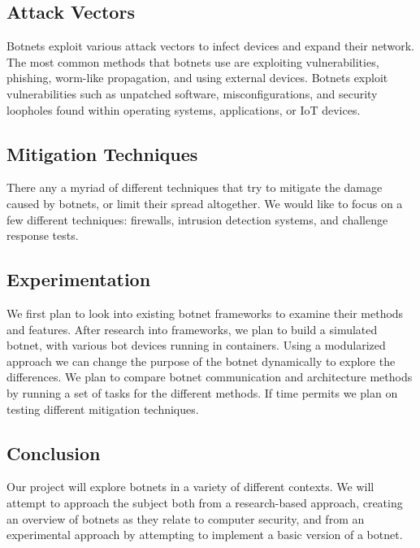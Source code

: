 \documentclass[english,12pt]{article}
\begin{document}
\subsection*{Attack Vectors}
Botnets exploit various attack vectors to infect devices 
and expand their network. The most common methods that botnets 
use are exploiting vulnerabilities, phishing, worm-like propagation, 
and using external devices. Botnets exploit vulnerabilities such as 
unpatched software, misconfigurations, and security loopholes 
found within operating systems, applications, or IoT devices. 
\subsection*{Mitigation Techniques}
There any a myriad of different techniques that try to mitigate the damage
caused by botnets, or limit their spread altogether. We would like to focus
on a few different techniques: firewalls, intrusion detection systems, and
challenge response tests. 
\subsection*{Experimentation}
We first plan to look into existing 
botnet frameworks to examine their methods and features. 
After research into frameworks, we plan to build a simulated botnet, 
with various bot devices running in containers. 
Using a modularized approach we can change the purpose of the botnet 
dynamically to explore the differences. We plan to compare botnet 
communication and architecture methods by running a set of tasks 
for the different methods. If time permits we plan on testing different 
mitigation techniques.
\subsection*{Conclusion}
Our project will explore botnets in a variety of different contexts. 
We will attempt to approach the subject both from a research-based approach,
creating an overview of botnets as they relate to computer security,
and from an experimental approach by attempting to implement a basic version of
a botnet.
\end{document}
